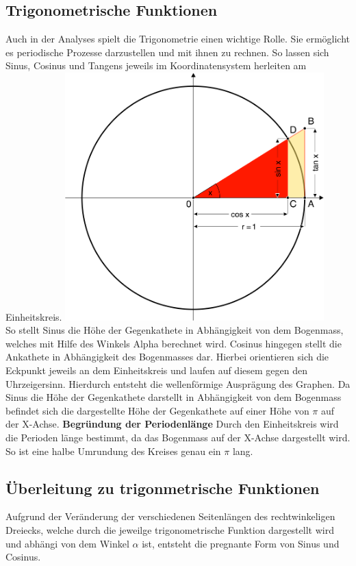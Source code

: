 \subsection{Trigonometrische Funktionen}\label{sec:Trigonometrie/Trigonometrische Funktionen}
 	Auch in der Analyses spielt die Trigonometrie einen wichtige Rolle. Sie ermöglicht es periodische Prozesse darzustellen und mit ihnen zu rechnen. So lassen sich Sinus, Cosinus und Tangens jeweils im Koordinatensystem herleiten am Einheitskreis.
\includegraphics[width=10cm]{Media/Winkelfunktionen_Einheitskreis}\\
So stellt Sinus die Höhe der Gegenkathete in Abhängigkeit von dem Bogenmass, welches mit Hilfe des
Winkels Alpha berechnet wird. Cosinus hingegen stellt die Ankathete in Abhängigkeit des Bogenmasses dar. Hierbei orientieren sich die Eckpunkt jeweils an dem Einheitskreis und laufen auf 
diesem gegen den Uhrzeigersinn. Hierdurch entsteht die wellenförmige Ausprägung des Graphen. Da Sinus die Höhe der Gegenkathete darstellt in Abhängigkeit von dem Bogenmass befindet sich die
dargestellte Höhe der Gegenkathete auf einer Höhe von $\pi$ auf der X-Achse. 
\textbf{Begründung der Periodenlänge}
Durch den Einheitskreis wird die Perioden länge bestimmt, da das Bogenmass auf der X-Achse dargestellt wird. So ist eine halbe Umrundung des Kreises genau ein $\pi$ lang. 


\subsection{Überleitung zu trigonmetrische Funktionen}\label{sec:Trigonometrie/Ueberleitung zu trigonometrischen Funktionen}
Aufgrund der Veränderung der verschiedenen Seitenlängen des rechtwinkeligen Dreiecks, welche durch die jeweilge trigonometrische Funktion dargestellt wird und abhängi
von dem Winkel $\alpha$ ist, entsteht die pregnante Form von Sinus und Cosinus. 
\\


